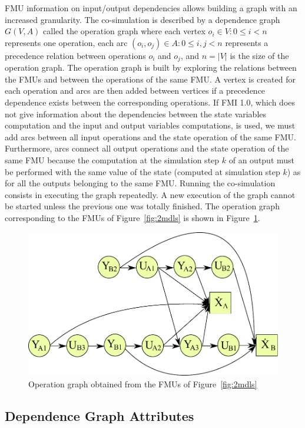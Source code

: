 FMU information on input/output dependencies allows building a graph with an increased granularity. The co-simulation is described by a dependence graph $G(V,A)$ called the operation graph where each vertex $o_i \in V: 0 \leq i < n$ represents one operation, each arc $(o_i,o_j) \in A: 0 \leq i,j < n$ represents a precedence relation between operations $o_i$ and $o_j$, and $n = |V|$ is the size of the operation graph. The operation graph is built by exploring the relations between the FMUs and between the operations of the same FMU. A vertex is created for each operation and arcs are then added between vertices if a precedence dependence exists between the corresponding operations. If FMI 1.0, which does not give information about the dependencies between the state variables computation and the input and output variables computations, is used, we must add arcs between all input operations and the state operation of the same FMU. Furthermore, arcs connect all output operations and the state operation of the same FMU because the computation at the simulation step $k$ of an output must be performed with the same value of the state (computed at simulation step $k$) as for all the outputs belonging to the same FMU. Running the co-simulation consists in executing the graph repeatedly. A new execution of the graph cannot be started unless the previous one was totally finished. The operation graph corresponding to the FMUs of Figure~\ref{fig:2mdls} is shown in Figure~\ref{fig:dag}.

\begin{figure}[htb]
\centering
  \includegraphics[scale=0.5]{figures/Operation_Graph_Two_Models}
\caption{Operation graph obtained from the FMUs of Figure~\ref{fig:2mdls}}
\label{fig:dag}
\end{figure} 

\subsection{Dependence Graph Attributes}

